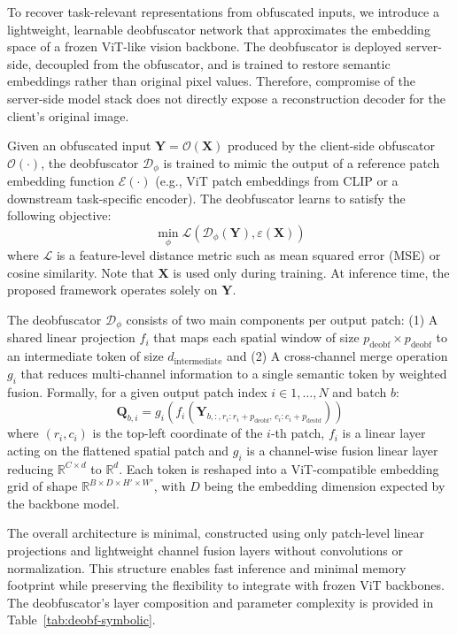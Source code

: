 \documentclass{ieeeaccess}
\newcommand{\rev}[1]{{\color{black}#1}}
\begin{document}
\rev{To recover task-relevant representations from obfuscated inputs, we introduce a lightweight, learnable deobfuscator network that approximates the embedding space of a frozen ViT-like vision backbone. The deobfuscator is deployed server-side, decoupled from the obfuscator, and is trained to restore semantic embeddings rather than original pixel values. Therefore, compromise of the server-side model stack does not directly expose a reconstruction decoder for the client's original image.}

Given an obfuscated input $\mathbf{Y} = \mathcal{O}(\mathbf{X})$ produced by the client-side obfuscator $\mathcal{O}(\cdot)$, the deobfuscator $\mathcal{D}_\phi$ is trained to mimic the output of a reference patch embedding function $\mathcal{E}(\cdot)$ (e.g., ViT patch embeddings from CLIP or a downstream task-specific encoder). The deobfuscator learns to satisfy the following objective:
\begin{equation}
    \min_{\phi} \mathcal{L}(\mathcal{D}_\phi(\mathbf{Y}),\varepsilon(\mathbf{X}))
\end{equation}
where $\mathcal{L}$ is a feature-level distance metric such as mean squared error (MSE) or cosine similarity. Note that $\mathbf{X}$ is used only during training. At inference time, the proposed framework operates solely on $\mathbf{Y}$.

The deobfuscator $\mathcal{D}_\phi$ consists of two main components per output patch: (1) A shared linear projection $f_i$ that maps each spatial window of size $p_{\text{deobf}} \times p_{\text{deobf}}$ to an intermediate token of size $d_{\text{intermediate}}$ and (2) A cross-channel merge operation $g_i$ that reduces multi-channel information to a single semantic token by weighted fusion. Formally, for a given output patch index $i \in {1, \dots, N}$ and batch $b$:
\begin{equation}
    \mathbf{Q}_{b,i} = g_i\left( f_i\left( \mathbf{Y}_{b,:,r_i:r_i+p_{\text{deobf}},\,c_i:c_i+p_{\text{deobf}}} \right) \right)
\end{equation}
where $(r_i, c_i)$ is the top-left coordinate of the $i$-th patch, $f_i$ is a linear layer acting on the flattened spatial patch and $g_i$ is a channel-wise fusion linear layer reducing $\mathbb{R}^{C \times d}$ to $\mathbb{R}^{d}$. Each token is reshaped into a ViT-compatible embedding grid of shape $\mathbb{R}^{B \times D \times H' \times W'}$, with $D$ being the embedding dimension expected by the backbone model.

The overall architecture is minimal, constructed using only patch-level linear projections and lightweight channel fusion layers without convolutions or normalization. This structure enables fast inference and minimal memory footprint while preserving the flexibility to integrate with frozen ViT backbones. The deobfuscator's layer composition and parameter complexity is provided in Table~\ref{tab:deobf-symbolic}.
\end{document}

